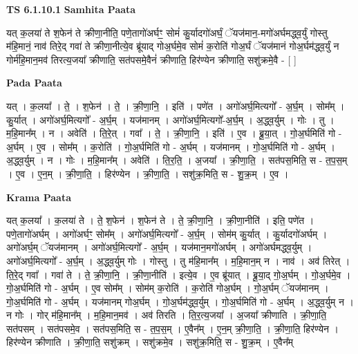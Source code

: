 \documentclass[17pt]{extarticle}
\begin{document}
\textbf{TS 6.1.10.1 } \newline
\textbf{Samhita Paata} \newline

यत् क॒लया॑ ते श॒फेन॑ ते क्रीणा॒नीति॒ पणे॒तागो॑अर्घꣳ॒॒ सोमं॑ कु॒र्यादगो॑अर्घं॒ ॅयज॑मान॒-मगो॑अर्घमद्ध्व॒र्युं गोस्तु म॑हि॒मानं॒ नाव॑ तिरे॒द् गवा॑ ते क्रीणा॒नीत्ये॒व ब्रू॑याद् गोअ॒र्घमे॒व सोमं॑ क॒रोति॑ गोअ॒र्घं ॅयज॑मानं गोअ॒र्घम॑द्ध्व॒र्युं न गोर्म॑हि॒मान॒मव॑ तिरत्य॒जया᳚ क्रीणाति॒ सत॑पसमे॒वैनं॑ क्रीणाति॒ हिर॑ण्येन क्रीणाति॒ सशु॑क्रमे॒वै - [  ] \newline

\textbf{Pada Paata} \newline

यत् । क॒लया᳚ । ते॒ । श॒फेन॑ । ते॒ । क्री॒णा॒नि॒ । इति॑ । पणे॑त । अगो॑अर्घ॒मित्यगो᳚ - अ॒र्घ॒म् । सोम᳚म् । कु॒र्यात् । अगो॑अर्घ॒मित्यगो᳚ - अ॒र्घ॒म् । यज॑मानम् । अगो॑अर्घ॒मित्यगो᳚-अ॒र्घ॒म् । अ॒द्ध्व॒र्युम् । गोः । तु । म॒हि॒मान᳚म् । न । अवेति॑ । ति॒रे॒त् । गवा᳚ । ते॒ । क्री॒णा॒नि॒ । इति॑ । ए॒व । ब्रू॒या॒त् । गो॒अ॒र्घमिति॑ गो - अ॒र्घम् । ए॒व । सोम᳚म् । क॒रोति॑ । गो॒अ॒र्घमिति॑ गो - अ॒र्घम् । यज॑मानम् । गो॒अ॒र्घमिति॑ गो - अ॒र्घम् । अ॒द्ध्व॒र्युम् । न । गोः । म॒हि॒मान᳚म् । अवेति॑ । ति॒र॒ति॒ । अ॒जया᳚ । क्री॒णा॒ति॒ । सत॑पस॒मिति॒ स - त॒प॒स॒म् । ए॒व । ए॒न॒म् । क्री॒णा॒ति॒ । हिर॑ण्येन । क्री॒णा॒ति॒ । सशु॑क्र॒मिति॒ स - शु॒क्र॒म् । ए॒व ।  \newline


\textbf{Krama Paata} \newline

यत् क॒लया᳚ । क॒लया॑ ते । ते॒ श॒फेन॑ । श॒फेन॑ ते । ते॒ क्री॒णा॒नि॒ । क्री॒णा॒नीति॑ । इति॒ पणे॑त । पणे॒तागो॑अर्घम् । अगो॑अर्घꣳ॒॒ सोम᳚म् । अगो॑अर्घ॒मित्यगो᳚ - अ॒र्घ॒म् । सोम॑म् कु॒र्यात् । कु॒र्यादगो॑अर्घम् । अगो॑अर्घ॒म् ॅयज॑मानम् । अगो॑अर्घ॒मित्यगो᳚ - अ॒र्घ॒म् । यज॑मान॒मगो॑अर्घम् । अगो॑अर्घमद्ध्व॒र्युम् । अगो॑अर्घ॒मित्यगो᳚ - अ॒र्घ॒म् । अ॒द्ध्व॒र्युम् गोः । गोस्तु । तु म॑हि॒मान᳚म् । म॒हि॒मान॒म् न । नाव॑ । अव॑ तिरेत् । ति॒रे॒द् गवा᳚ । गवा॑ ते । ते॒ क्री॒णा॒नि॒ । क्री॒णा॒नीति॑ । इत्ये॒व । ए॒व ब्रू॑यात् । ब्रू॒या॒द् गो॒अ॒र्घम् । गो॒अ॒र्घमे॒व । गो॒अ॒र्घमिति॑ गो - अ॒र्घम् । ए॒व सोम᳚म् । सोम॑म् क॒रोति॑ । क॒रोति॑ गोअ॒र्घम् । गो॒अ॒र्घम् ॅयज॑मानम् । गो॒अ॒र्घमिति॑ गो - अ॒र्घम् । यज॑मानम् गोअ॒र्घम् । गो॒अ॒र्घम॑द्ध्व॒र्युम् । गो॒अ॒र्घमिति॑ गो - अ॒र्घम् । अ॒द्ध्व॒र्युम् न । न गोः । गोर् म॑हि॒मान᳚म् । म॒हि॒मान॒मव॑ । अव॑ तिरति । ति॒र॒त्य॒जया᳚ । अ॒जया᳚ क्रीणाति । क्री॒णा॒ति॒ सत॑पसम् । सत॑पसमे॒व । सत॑पस॒मिति॒ स - त॒प॒स॒म् । ए॒वैन᳚म् । ए॒न॒म् क्री॒णा॒ति॒ । क्री॒णा॒ति॒ हिर॑ण्येन । हिर॑ण्येन क्रीणाति । क्री॒णा॒ति॒ सशु॑क्रम् । सशु॑क्रमे॒व । सशु॑क्र॒मिति॒ स - शु॒क्र॒म् । ए॒वैन᳚म् \newline
\end{document}
